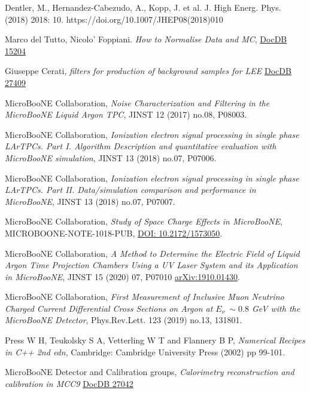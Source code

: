 \documentclass[a4paper]{article}
\begin{document}
\begin{thebibliography}{}
Dentler, M., Hernandez-Cabezudo, A., Kopp, J. et al. J. High Energ. Phys. (2018) 2018: 10. https://doi.org/10.1007/JHEP08(2018)010

Marco del Tutto, Nicolo' Foppiani. \emph{How to Normalise Data and MC}, \href{https://microboone-docdb.fnal.gov/cgi-bin/private/ShowDocument?docid=15204}{DocDB 15204}

Giuseppe Cerati, \emph{filters for production of background samples for LEE} \href{https://microboone-docdb.fnal.gov/cgi-bin/private/ShowDocument?docid=27409}{DocDB 27409}

MicroBooNE Collaboration, \emph{Noise Characterization and Filtering in the MicroBooNE Liquid Argon TPC}, JINST 12 (2017) no.08, P08003.

MicroBooNE Collaboration, \emph{Ionization electron signal processing in single phase LArTPCs. Part I. Algorithm Description and quantitative evaluation with MicroBooNE simulation}, JINST 13 (2018) no.07, P07006.

MicroBooNE Collaboration, \emph{Ionization electron signal processing in single phase LArTPCs. Part II. Data/simulation comparison and performance in MicroBooNE}, JINST 13 (2018) no.07, P07007.

MicroBooNE Collaboration, \emph{Study of Space Charge Effects in MicroBooNE}, MICROBOONE-NOTE-1018-PUB, \href{http://inspirehep.net/record/1763018}{DOI: 10.2172/1573050}.

MicroBooNE Collaboration, \emph{A Method to Determine the Electric Field of Liquid Argon Time Projection Chambers Using a UV Laser System and its Application in MicroBooNE}, JINST 15 (2020) 07, P07010 \href{https://arxiv.org/abs/1910.01430}{arXiv:1910.01430}.

MicroBooNE Collaboration, \emph{First Measurement of Inclusive Muon Neutrino Charged Current Differential Cross Sections on Argon at $E_\nu ~\sim0.8$ GeV with the MicroBooNE Detector}, Phys.Rev.Lett. 123 (2019) no.13, 131801.

Press W H, Teukolsky S A, Vetterling W T and Flannery B P, \emph{Numerical Recipes in C++ 2nd edn}, Cambridge: Cambridge University Press (2002) pp 99-101.

MicroBooNE Detector and Calibration groups, \emph{Calorimetry reconstruction and calibration in MCC9}
\href{https://microboone-docdb.fnal.gov/cgi-bin/private/ShowDocument?docid=27042}{DocDB 27042}


\end{thebibliography}
\end{document}

